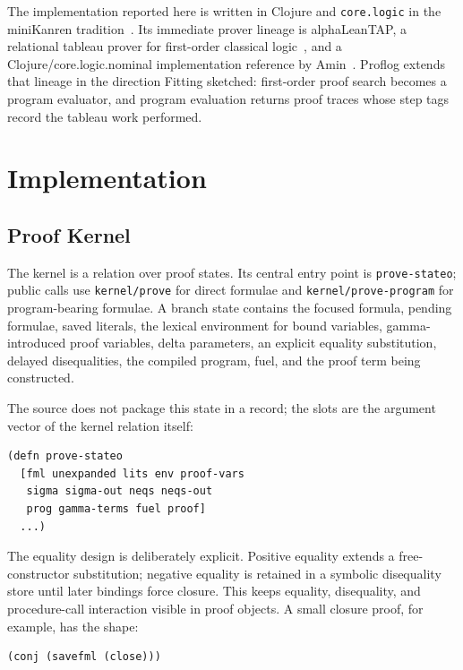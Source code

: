 \documentclass[acmsmall,screen,review,anonymous]{acmart}
\begin{document}
The implementation reported here is written in Clojure and \texttt{core.logic}
in the miniKanren tradition~\cite{byrd2009relational,corelogic}.  Its immediate
prover lineage is alphaLeanTAP, a relational tableau prover for first-order
classical logic~\cite{near2008alphaleantap}, and a Clojure/core.logic.nominal
implementation reference by Amin~\cite{aminLeantap}.  Proflog extends that
lineage in the direction Fitting sketched: first-order proof search becomes a
program evaluator, and program evaluation returns proof traces whose step tags
record the tableau work performed.

\section{Implementation}

\subsection{Proof Kernel}

The kernel is a relation over proof states.  Its central entry point is
\texttt{prove-stateo}; public calls use \texttt{kernel/prove} for direct
formulae and \texttt{kernel/prove-program} for program-bearing formulae.  A
branch state contains the focused formula, pending formulae, saved literals,
the lexical environment for bound variables, gamma-introduced proof variables,
delta parameters, an explicit equality substitution, delayed disequalities, the
compiled program, fuel, and the proof term being constructed.

The source does not package this state in a record; the slots are the argument
vector of the kernel relation itself:

\begin{verbatim}
(defn prove-stateo
  [fml unexpanded lits env proof-vars
   sigma sigma-out neqs neqs-out
   prog gamma-terms fuel proof]
  ...)
\end{verbatim}

The equality design is deliberately explicit.  Positive equality extends a
free-constructor substitution; negative equality is retained in a symbolic
disequality store until later bindings force closure.  This keeps equality,
disequality, and procedure-call interaction visible in proof objects.  A small
closure proof, for example, has the shape:

\begin{verbatim}
(conj (savefml (close)))
\end{verbatim}
\end{document}
